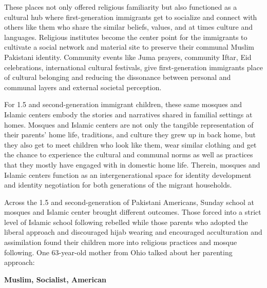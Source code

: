 These places not only offered religious familiarity but also functioned as a cultural hub where first-generation immigrants get to socialize and connect with others like them who share the similar beliefs, values, and at times culture and languages. Religious institutes become the center point for the immigrants to cultivate a social network and material site to preserve their communal Muslim Pakistani identity. Community events like Juma prayers, community Iftar, Eid celebrations, international cultural festivals, give first-generation immigrants place of cultural belonging and reducing the dissonance between personal and communal layers and external societal perception.

For 1.5 and second-generation immigrant children, these same mosques and Islamic centers embody the stories and narratives shared in familial settings at homes. Mosques and Islamic centers are not only the tangible representation of their parents’ home life, traditions,  and culture they grew up in back home, but they also get to meet children who look like them, wear similar clothing and get the chance to experience the cultural and communal norms as well as practices that they mostly have engaged with in domestic home life. Therein, mosques and Islamic centers function as an intergenerational space for identity development and identity negotiation for both generations of the migrant households. 
 
Across the 1.5 and second-generation of Pakistani Americans, Sunday school at mosques and Islamic center brought different outcomes. Those forced into a strict level of Islamic school following rebelled while those parents who adopted the liberal approach and discouraged hijab wearing and encouraged acculturation and assimilation found their children more into religious practices and mosque following. One 63-year-old mother from Ohio talked about her parenting approach:

\textbf{Muslim, Socialist, American}

